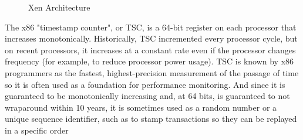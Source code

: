 \begin{figure}[H]
	\centering
	
	\caption{Xen Architecture} \label{fig:xen-arch}
\end{figure}





The x86 "timestamp counter", or TSC, is a 64-bit register on each
processor that increases monotonically.  Historically, TSC incremented
every processor cycle, but on recent processors, it increases
at a constant rate even if the processor changes frequency (for example,
to reduce processor power usage).  TSC is known by x86 programmers
as the fastest, highest-precision measurement of the passage of time
so it is often used as a foundation for performance monitoring.
And since it is guaranteed to be monotonically increasing and, at
64 bits, is guaranteed to not wraparound within 10 years, it is
sometimes used as a random number or a unique sequence identifier,
such as to stamp transactions so they can be replayed in a specific
order
\cite{xentscmode}

